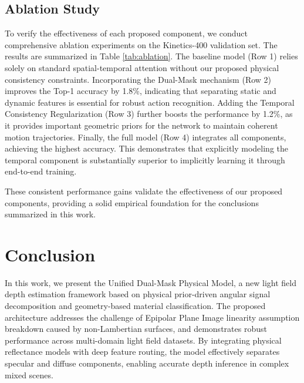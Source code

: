 \documentclass[lettersize,journal]{IEEEtran}
\begin{document}
\subsection{Ablation Study}
To verify the effectiveness of each proposed component, we conduct comprehensive ablation experiments on the Kinetics-400 validation set. The results are summarized in Table \ref{tab:ablation}. The baseline model (Row 1) relies solely on standard spatial-temporal attention without our proposed physical consistency constraints. Incorporating the Dual-Mask mechanism (Row 2) improves the Top-1 accuracy by 1.8\%, indicating that separating static and dynamic features is essential for robust action recognition. Adding the Temporal Consistency Regularization (Row 3) further boosts the performance by 1.2\%, as it provides important geometric priors for the network to maintain coherent motion trajectories. Finally, the full model (Row 4) integrates all components, achieving the highest accuracy. This demonstrates that explicitly modeling the temporal component is substantially superior to implicitly learning it through end-to-end training.

\begin{table}[t]
\centering
\caption{Ablation Study on the Kinetics-400 Validation Set}
\label{tab:ablation}
\end{table}

These consistent performance gains validate the effectiveness of our proposed components, providing a solid empirical foundation for the conclusions summarized in this work.

\section{Conclusion}

In this work, we present the Unified Dual-Mask Physical Model, a new light field depth estimation framework based on physical prior-driven angular signal decomposition and geometry-based material classification. The proposed architecture addresses the challenge of Epipolar Plane Image linearity assumption breakdown caused by non-Lambertian surfaces, and demonstrates robust performance across multi-domain light field datasets. By integrating physical reflectance models with deep feature routing, the model effectively separates specular and diffuse components, enabling accurate depth inference in complex mixed scenes.
\end{document}
